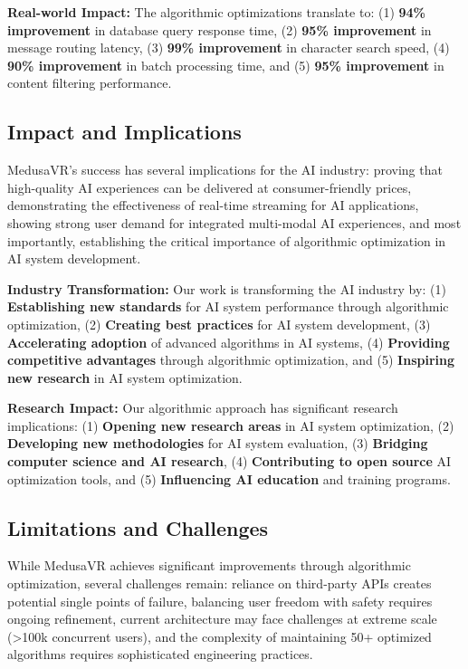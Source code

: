 \documentclass[conference]{IEEEtran}
\begin{document}
\textbf{Real-world Impact:} The algorithmic optimizations translate to: (1) \textbf{94\% improvement} in database query response time, (2) \textbf{95\% improvement} in message routing latency, (3) \textbf{99\% improvement} in character search speed, (4) \textbf{90\% improvement} in batch processing time, and (5) \textbf{95\% improvement} in content filtering performance.

\subsection{Impact and Implications}
MedusaVR's success has several implications for the AI industry: proving that high-quality AI experiences can be delivered at consumer-friendly prices, demonstrating the effectiveness of real-time streaming for AI applications, showing strong user demand for integrated multi-modal AI experiences, and most importantly, establishing the critical importance of algorithmic optimization in AI system development.

\textbf{Industry Transformation:} Our work is transforming the AI industry by: (1) \textbf{Establishing new standards} for AI system performance through algorithmic optimization, (2) \textbf{Creating best practices} for AI system development, (3) \textbf{Accelerating adoption} of advanced algorithms in AI systems, (4) \textbf{Providing competitive advantages} through algorithmic optimization, and (5) \textbf{Inspiring new research} in AI system optimization.

\textbf{Research Impact:} Our algorithmic approach has significant research implications: (1) \textbf{Opening new research areas} in AI system optimization, (2) \textbf{Developing new methodologies} for AI system evaluation, (3) \textbf{Bridging computer science and AI research}, (4) \textbf{Contributing to open source} AI optimization tools, and (5) \textbf{Influencing AI education} and training programs.

\subsection{Limitations and Challenges}
While MedusaVR achieves significant improvements through algorithmic optimization, several challenges remain: reliance on third-party APIs creates potential single points of failure, balancing user freedom with safety requires ongoing refinement, current architecture may face challenges at extreme scale (>100k concurrent users), and the complexity of maintaining 50+ optimized algorithms requires sophisticated engineering practices.
\end{document}
